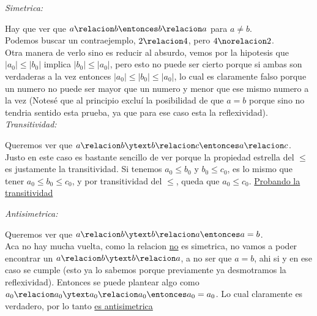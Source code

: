 \begin{enumerate}[label=\roman*)]
        \textit{Simetrica: }\par
        Hay que ver que $a \relacion b \entonces b \relacion a$ para $a\neq b$. \\
        Podemos buscar un contraejemplo, $2 \relacion 4$, pero $4 \norelacion 2$. \\
        Otra manera de verlo sino es reducir al absurdo, vemos por la hipotesis que $|a_0| \leq |b_0|$ implica $|b_0| \leq |a_0|$,
        pero esto no puede ser cierto porque si ambas son verdaderas a la vez entonces $|a_0| \leq |b_0| \leq |a_0|$, lo cual es claramente falso
        porque un numero no puede ser mayor que un numero y menor que ese mismo numero a la vez (Notesé que al principio excluí la posibilidad
        de que $a = b$ porque sino no tendria sentido esta prueba, ya que para ese caso esta la reflexividad). \\

        \textit{Transitividad: }\par
        Queremos ver que $a \relacion b \ytext b \relacion c \entonces a \relacion c$. \\
        Justo en este caso es bastante sencillo de ver porque la propiedad estrella del $\leq$ es justamente la transitividad. 
        Si tenemos $a_0 \leq b_0$ y $b_0 \leq c_0$, es lo mismo que tener $a_0 \leq b_0 \leq c_0$, y por transitividad del $\leq$, 
        queda que $a_0 \leq c_0$. \underline{Probando la transitividad}

        \textit{Antisimetrica: }\par    
        Queremos ver que $a \relacion b \ytext b \relacion a \entonces a = b$. \\
        Aca no hay mucha vuelta, como la relacion \underline{no} es simetrica, no vamos a poder encontrar un 
        $a \relacion b \ytext b \relacion a$, a no ser que $a = b$, ahi si y en ese caso se cumple (esto ya lo sabemos
        porque previamente ya desmotramos la reflexividad). Entonces se puede plantear algo como $a_0 \relacion a_0 
        \ytext a_0 \relacion a_0 \entonces a_0 = a_0$. Lo cual claramente es verdadero, por lo tanto \underline{es antisimetrica}
    


\end{enumerate}
